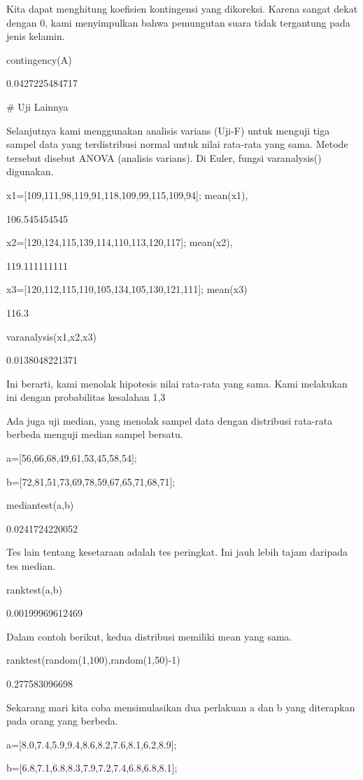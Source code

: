 \documentclass{article}
\begin{document}
Kita dapat menghitung koefisien kontingensi yang dikoreksi. Karena
sangat dekat dengan 0, kami menyimpulkan bahwa pemungutan suara tidak
tergantung pada jenis kelamin.


\>contingency(A)


    0.0427225484717

# Uji Lainnya

Selanjutnya kami menggunakan analisis varians (Uji-F) untuk menguji
tiga sampel data yang terdistribusi normal untuk nilai rata-rata yang
sama. Metode tersebut disebut ANOVA (analisis varians). Di Euler,
fungsi varanalysis() digunakan.


\>x1=[109,111,98,119,91,118,109,99,115,109,94]; mean(x1),


    106.545454545

\>x2=[120,124,115,139,114,110,113,120,117]; mean(x2),


    119.111111111

\>x3=[120,112,115,110,105,134,105,130,121,111]; mean(x3)


    116.3

\>varanalysis(x1,x2,x3)


    0.0138048221371

Ini berarti, kami menolak hipotesis nilai rata-rata yang sama. Kami
melakukan ini dengan probabilitas kesalahan 1,3%


Ada juga uji median, yang menolak sampel data dengan distribusi
rata-rata berbeda menguji median sampel bersatu.


\>a=[56,66,68,49,61,53,45,58,54];

\>b=[72,81,51,73,69,78,59,67,65,71,68,71];

\>mediantest(a,b)


    0.0241724220052

Tes lain tentang kesetaraan adalah tes peringkat. Ini jauh lebih tajam
daripada tes median.


\>ranktest(a,b)


    0.00199969612469

Dalam contoh berikut, kedua distribusi memiliki mean yang sama.


\>ranktest(random(1,100),random(1,50)-1)


    0.277583096698

Sekarang mari kita coba mensimulasikan dua perlakuan a dan b yang
diterapkan pada orang yang berbeda.


\>a=[8.0,7.4,5.9,9.4,8.6,8.2,7.6,8.1,6.2,8.9];

\>b=[6.8,7.1,6.8,8.3,7.9,7.2,7.4,6.8,6.8,8.1];
\end{document}
